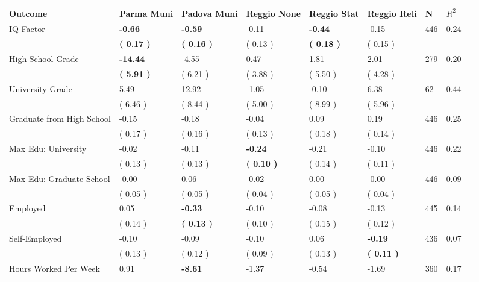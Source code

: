 \begin{tabular}{L{6.2cm} C{1.8cm} C{1.8cm} C{1.8cm} C{1.8cm} C{1.8cm} C{1.8cm} C{0.3cm} C{0.3cm}}
\toprule
 \textbf{Outcome} & \textbf{Parma Muni} & \textbf{Padova Muni} & \textbf{Reggio None} & \textbf{Reggio Stat} & \textbf{Reggio Reli} & \textbf{N} & \textbf{$ R^2$} \\
\midrule
IQ Factor & \textbf{    -0.66} & \textbf{    -0.59} &     -0.11 & \textbf{    -0.44} &     -0.15  & 446 &       0.24 \\ 
 & \textbf{(     0.17 )} & \textbf{(     0.16 )} & (     0.13 ) & \textbf{(     0.18 )} & (     0.15 )  & \\
High School Grade & \textbf{   -14.44} &     -4.55 &      0.47 &      1.81 &      2.01  & 279 &       0.20 \\ 
 & \textbf{(     5.91 )} & (     6.21 ) & (     3.88 ) & (     5.50 ) & (     4.28 )  & \\
University Grade &      5.49 &     12.92 &     -1.05 &     -0.10 &      6.38  & 62 &       0.44 \\ 
 & (     6.46 ) & (     8.44 ) & (     5.00 ) & (     8.99 ) & (     5.96 )  & \\
Graduate from High School &     -0.15 &     -0.18 &     -0.04 &      0.09 &      0.19  & 446 &       0.25 \\ 
 & (     0.17 ) & (     0.16 ) & (     0.13 ) & (     0.18 ) & (     0.14 )  & \\
Max Edu: University &     -0.02 &     -0.11 & \textbf{    -0.24} &     -0.21 &     -0.10  & 446 &       0.22 \\ 
 & (     0.13 ) & (     0.13 ) & \textbf{(     0.10 )} & (     0.14 ) & (     0.11 )  & \\
Max Edu: Graduate School &     -0.00 &      0.06 &     -0.02 &      0.00 &     -0.00  & 446 &       0.09 \\ 
 & (     0.05 ) & (     0.05 ) & (     0.04 ) & (     0.05 ) & (     0.04 )  & \\
Employed &      0.05 & \textbf{    -0.33} &     -0.10 &     -0.08 &     -0.13  & 445 &       0.14 \\ 
 & (     0.14 ) & \textbf{(     0.13 )} & (     0.10 ) & (     0.15 ) & (     0.12 )  & \\
Self-Employed &     -0.10 &     -0.09 &     -0.10 &      0.06 & \textbf{    -0.19}  & 436 &       0.07 \\ 
 & (     0.13 ) & (     0.12 ) & (     0.09 ) & (     0.13 ) & \textbf{(     0.11 )}  & \\
Hours Worked Per Week &      0.91 & \textbf{    -8.61} &     -1.37 &     -0.54 &     -1.69  & 360 &       0.17 \\ 

\end{tabular}

